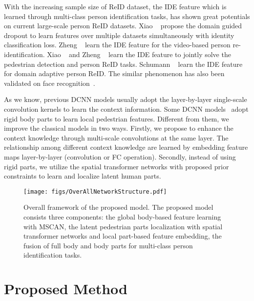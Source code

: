 \documentclass[10pt,twocolumn,letterpaper]{article}
\begin{document}
With the increasing sample size of ReID dataset, the IDE feature which is learned through multi-class person identification tasks,
has shown great potentials on current large-scale person ReID datasets.
Xiao \etal~\cite{XiaotongCVPR16Domain} propose the domain guided dropout to learn features over multiple datasets simultaneously with identity classification loss.
Zheng \etal~\cite{ZhengliangECCV16} learn the IDE feature for the video-based person re-identification.
Xiao \etal~\cite{XiaotongARXIV16end} and Zheng \etal~\cite{ZhengliangArxiv16} learn the IDE feature to jointly solve the pedestrian detection and person ReID tasks.
Schumann \etal~\cite{SchumannArxiv16deep} learn the IDE feature for domain adaptive person ReID.
The similar phenomenon has also been validated on face recognition~\cite{SunyiCVPR14deep1}.


As we know, previous DCNN models usually adopt the layer-by-layer single-scale convolution kernels to learn the context information.
Some DCNN models~\cite{YiICPR14DML,Chengde2016person,Shihanlin2016Embedding} adopt rigid body parts to learn local pedestrian features.
Different from them, we improve the classical models in two ways.
Firstly, we propose to enhance the context knowledge through multi-scale convolutions at the same layer.
The relationship among different context knowledge are learned by embedding feature maps layer-by-layer (convolution or FC operation).
Secondly, instead of using rigid parts, we utilize the spatial transformer networks with proposed prior constraints to learn and localize latent human parts.



\begin{figure*}[!htbp]
  \centering
\texttt{[image: figs/OverAllNetworkStructure.pdf]}
  \caption{Overall framework of the proposed model. The proposed model consists three components:
  the global body-based feature learning with MSCAN, the latent pedestrian parts localization with spatial
  transformer networks and local part-based feature embedding, the fusion of full body and
  body parts for multi-class person identification tasks.
  }
  \label{fig:framework_all}
  \vspace{-1em}
\end{figure*}

\section{Proposed Method}
\label{proposedmethod}
\end{document}
